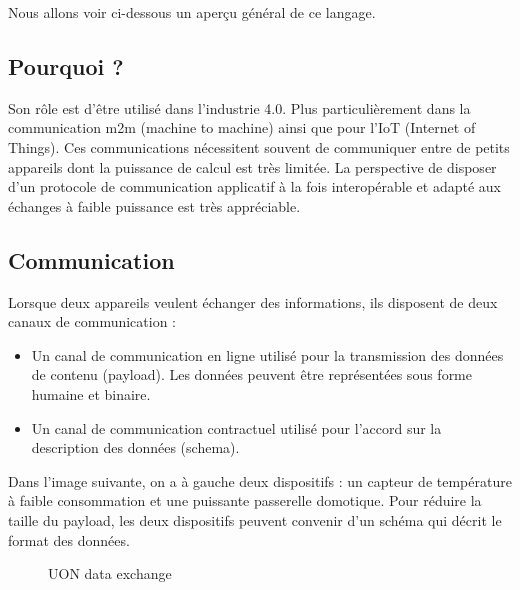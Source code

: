 \documentclass[
    iict, %
    il, %
]{heig-tb}
\begin{document}
Nous allons voir ci-dessous un aperçu général de ce langage.

\subsection{Pourquoi ?}
Son rôle est d'être utilisé dans l'industrie 4.0. Plus particulièrement dans la communication m2m (machine to machine) ainsi que pour l'IoT (Internet of Things).
Ces communications nécessitent souvent de communiquer entre de petits appareils dont la puissance de calcul est très limitée.
La perspective de disposer d'un protocole de communication applicatif à la fois interopérable et adapté aux échanges à faible puissance est très appréciable.

\subsection{Communication}
Lorsque deux appareils veulent échanger des informations, ils disposent de deux canaux de communication :
\begin{itemize}
    \item Un canal de communication en ligne utilisé pour la transmission des données de contenu (payload). Les données peuvent être représentées sous forme humaine et binaire.
    \item Un canal de communication contractuel utilisé pour l'accord sur la description des données (schema).
\end{itemize}

\vspace{\parskip}

Dans l'image suivante, on a à gauche deux dispositifs : un capteur de température à faible consommation
et une puissante passerelle domotique. Pour réduire la taille du payload, les deux dispositifs peuvent convenir d'un schéma qui décrit le format des données.

\begin{figure}[!h]
    \begin{center}
    \end{center}
    \caption[UON data exchange]{\label{data-exchange}UON data exchange}
\end{figure}
\end{document}
